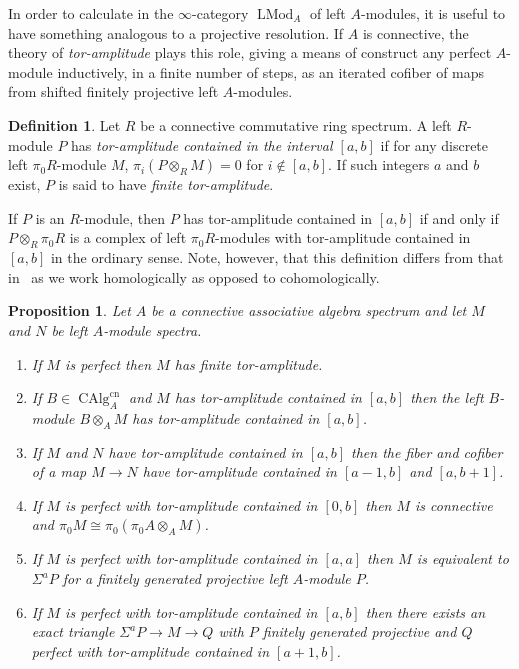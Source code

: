 \documentclass[12pt]{article}
\newtheorem{proposition}{Proposition}[subsection]
\theoremstyle{definition}
\newtheorem{definition}{Definition}[subsection]
\renewcommand{\i}{\infty}
\DeclareMathOperator{\LMod}{LMod}
\DeclareMathOperator{\CAlg}{CAlg}
\newcommand{\cn}{\mathrm{cn}}
\begin{document}
In order to calculate in the $\i$-category $\LMod_A$ of left $A$-modules, it is useful to have something analogous to a projective resolution.
If $A$ is connective, the theory of {\em tor-amplitude} plays this role, giving a means of construct any perfect $A$-module inductively, in a finite number of steps, as an iterated cofiber of maps from shifted finitely projective left $A$-modules.






\begin{definition}
Let $R$ be a connective commutative ring spectrum.
A left  $R$-module   $P$   has   {\em tor-amplitude   contained   in   the   interval   $[a,b]$} if  for  any  discrete left $\pi_0  R$-module  $M$, $\pi_i(P\otimes_R M)=0$ for $i\notin [a,b]$. If such integers $a$ and $b$ exist,  $P$ is said to have {\em finite tor-amplitude}.
\end{definition}

If $P$ is an $R$-module, then $P$ has tor-amplitude contained in $[a,b]$ if and only if $P\otimes_R \pi_0
R$  is  a  complex  of  left $\pi_0  R$-modules  with  tor-amplitude  contained  in  $[a,b]$ in
the ordinary sense. Note, however, that this definition  differs  from  that
in~\cite[I  5.2]{SGA6}  as  we  work homologically as opposed to cohomologically.



\begin{proposition}{\em \cite[Proposition 2.13]{AG14}}\label{prop:tor}
Let $A$ be a connective associative algebra spectrum and let $M$ and $N$ be left $A$-module spectra.
\begin{enumerate}
\itemsep.1em
\item[\em{(1)}]  If  $M$  is   perfect  then $M$   has   finite   tor-amplitude.
\item[\em{(2)}]   If $B\in\CAlg_A^{\cn}$ and $M$ has tor-amplitude contained in $[a,b]$ then the left $B$-module $B\otimes_A M$ has tor-amplitude contained in $[a,b]$.
\item[\em{(3)}]  If $M$ and $N$ have tor-amplitude contained in $[a,b]$ then the fiber and cofiber of a map $M\to N$ have tor-amplitude contained in $[a-1,b]$ and $[a,b+1]$.
\item[\em{(4)}]   If $M$ is perfect  with tor-amplitude contained in $[0,b]$ then $M$ is connective and $\pi_0   M\cong\pi_0(\pi_0 A\otimes_A M)$.
\item[\em{(5)}] If $M$ is  perfect  with  tor-amplitude  contained  in  $[a,a]$ then $M$ is equivalent to $\Sigma^{a}P$ for a finitely generated projective left $A$-module $P$.
\item[\em{(6)}]   If $M$ is perfect with tor-amplitude contained in $[a,b]$ then there exists an exact triangle $\Sigma^a P\rightarrow M\to Q$ with $P$ finitely generated projective and $Q$ perfect with tor-amplitude contained in $[a+1,b]$.
\end{enumerate}
\end{proposition}
\end{document}
